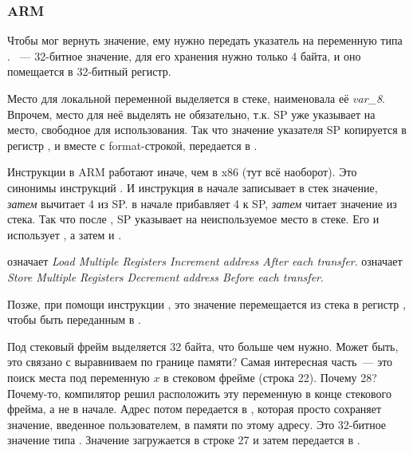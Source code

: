 \subsubsection{ARM}

\myparagraph{\OptimizingKeilVI (\ThumbMode)}



\myindex{\CLanguageElements!\Pointers}
Чтобы \scanf мог вернуть значение, ему нужно передать указатель на переменную типа \Tint.
\Tint~--- 32-битное значение, для его хранения нужно только 4 байта, и оно помещается в 32-битный регистр.

Место для локальной переменной  выделяется в стеке, \IDA наименовала её \emph{var\_8}. 
Впрочем, место для неё выделять не обязательно, т.к.  \ac{SP} уже указывает на место, 
свободное для использования.
Так что значение указателя \ac{SP} копируется в регистр , и вместе с format-строкой, 
передается в \scanf.

Инструкции  в ARM работают иначе, чем в x86 (тут всё наоборот).
Это синонимы инструкций .
И инструкция  в начале записывает в стек значение, \emph{затем} вычитает 4 из \ac{SP}.
 в начале прибавляет 4 к \ac{SP}, \emph{затем} читает значение из стека.
Так что после , \ac{SP} указывает на неиспользуемое место в стеке.
Его и использует \scanf, а затем и \printf.

 означает \emph{Load Multiple Registers Increment address After each transfer}.
 означает \emph{Store Multiple Registers Decrement address Before each transfer}.

Позже, при помощи инструкции , это значение перемещается из стека в регистр , чтобы быть переданным в \printf.




Под стековый фрейм выделяется 32 байта, что больше чем нужно. Может быть, это связано с выравниваем по границе памяти?
Самая интересная часть~--- это поиск места под переменную $x$ в стековом фрейме (строка 22).
Почему 28? Почему-то, компилятор решил расположить эту переменную в конце стекового фрейма, а не в начале.
Адрес потом передается в \scanf, которая просто сохраняет значение, введенное пользователем, в памяти по этому адресу.
Это 32-битное значение типа \Tint.
Значение загружается в строке 27 и затем передается в \printf.

